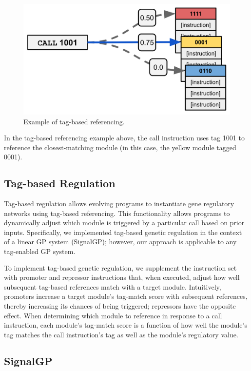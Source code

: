 \documentclass[
]{book}
\begin{document}
\begin{figure}
\centering
\includegraphics{./media/tag-based-referencing.png}
\caption{Example of tag-based referencing.}
\end{figure}

In the tag-based referencing example above, the call instruction uses tag 1001 to reference the closest-matching module (in this case, the yellow module tagged 0001).

\hypertarget{tag-based-regulation}{%
\subsection{Tag-based Regulation}\label{tag-based-regulation}}

Tag-based regulation allows evolving programs to instantiate gene regulatory networks using tag-based referencing.
This functionality allows programs to dynamically adjust which module is triggered by a particular call based on prior inputs.
Specifically, we implemented tag-based genetic regulation in the context of a linear GP system (SignalGP); however, our approach is applicable to any tag-enabled GP system.

To implement tag-based genetic regulation, we supplement the instruction set with promoter and repressor instructions that, when executed, adjust how well subsequent tag-based references match with a target module.
Intuitively, promoters increase a target module's tag-match score with subsequent references, thereby increasing its chances of being triggered; repressors have the opposite effect.
When determining which module to reference in response to a call instruction, each module's tag-match score is a function of how well the module's tag matches the call instruction's tag as well as the module's regulatory value.

\hypertarget{signalgp}{%
\subsection{SignalGP}\label{signalgp}}
\end{document}
